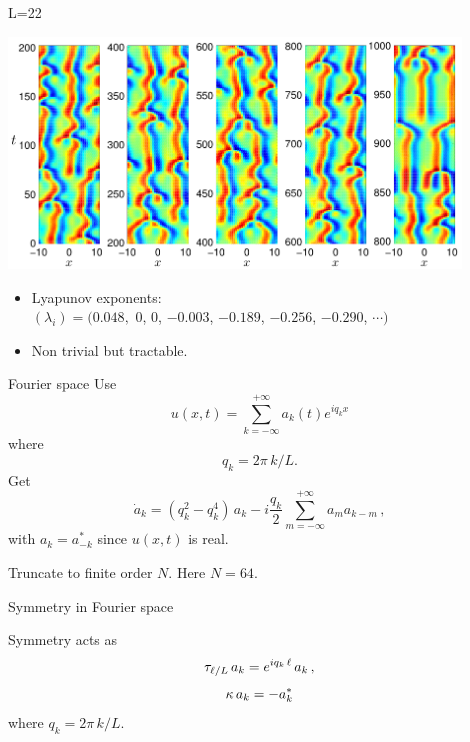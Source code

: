 \documentclass{beamer}
\begin{document}
\begin{frame}{L=22}
\begin{center}
  \includegraphics[width=0.9\textwidth,clip=true]{../../figs/ks_L22_long_orbit}
\end{center}

\begin{block}{} 
 \begin{itemize}
  \item Lyapunov exponents: \\
	$(\lambda_i) = (0.048,$ 0, 0, $-0.003$, $-0.189$, $-0.256$, $-0.290$, $\cdots)$
  \item Non trivial but tractable.	
 \end{itemize}

\end{block}
 
\end{frame}

\begin{frame}{Fourier space}
Use
\[
  u(x,t)=\sum_{k=-\infty}^{+\infty} a_k (t) e^{ i q_k x }
\]
where
\[
 q_k = 2\pi\,k/L.
\]
Get
\[
 \dot{a}_k
     = ( q_k^2 - q_k^4 )\, a_k
    - i \frac{q_k}{2} \sum_{m=-\infty}^{+\infty} a_m a_{k-m}\,,
\]
with $a_{k}=a^\ast_{-k}$ since $u(x,t)$ is real.

Truncate to finite order $N$. Here $N=64$.
\end{frame}

\begin{frame}{Symmetry in Fourier space}

Symmetry acts as
\[
  \tau_{\ell/L}\, a_k = e^{i q_k\, \ell} \, a_k \,,
  \label{eq:shiftF}
\]
\[
   \kappa \, a_k = -a_k^\ast
\]
where $q_k = 2\pi\,k/L$.

\end{frame}
\end{document}

